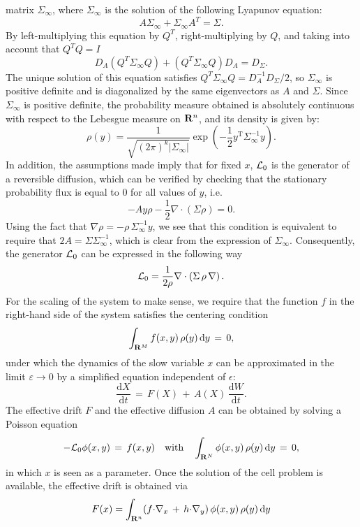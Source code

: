 matrix $\Sigma_\infty$, where $\Sigma_\infty$ is the solution of the
following Lyapunov equation:
$$ A \Sigma_\infty + \Sigma_\infty A^T = \Sigma. $$
By left-multiplying this equation by $Q^T$, right-multiplying by $Q$, and
taking into account that $Q^T Q = I$
$$ D_A (Q^T \Sigma_\infty Q) + (Q^T\Sigma_\infty Q)  D_A= D_\Sigma. $$ 
The unique solution of this equation satisfies $Q^T \Sigma_\infty Q = D_A^{-1}
D_\Sigma/2$, so $\Sigma_\infty$ is positive definite and is diagonalized by the
same eigenvectors as $A$ and $\Sigma$. Since $\Sigma_\infty$ is positive
definite, the probability measure obtained is absolutely continuous with
respect to the Lebesgue measure on $\mathbf R^n$, and its density is given by:
$$\rho(y)= \frac{1}{\sqrt{(2\pi)^k| \Sigma_\infty|}}
\exp\left(-\frac{1}{2}y^\mathrm{T}\Sigma_\infty^{-1}y \right).$$
In addition, the assumptions made imply that for fixed $x$, $\mathcal L_0$ is
the generator of a reversible diffusion, which can be verified by checking that
the stationary probability flux is equal to $0$ for all values of $y$, i.e.
$$ -Ay\rho - \frac{1}{2} \nabla \cdot \left(\Sigma \rho\right) = 0.$$ 
Using the fact that $\nabla \rho =- \rho \, \Sigma_\infty^{-1}y$, we see that
this condition is equivalent to require that $2A = \Sigma \Sigma_\infty^{-1}$,
which is clear from the expression of $\Sigma_\infty$. Consequently, the generator 
$\mathcal L_0$ can be expressed in the following way
$$ \mathcal L_0  = \frac{1}{2\rho}\nabla \cdot \left( \Sigma\,\rho\, \nabla  \right). $$
For the scaling of the system to make sense, we require that the function $f$
in the right-hand side of the system satisfies the centering condition
$$
\int_{\mathbf R^M} f(x,y) \, {\rho}(y)\,\mathrm dy \,=\, 0, 
$$
under which the dynamics of the slow variable $x$ can be approximated in the
limit $\varepsilon \to 0$ by a simplified equation independent of $\epsilon$:
\begin{equation*} 
    \frac{\mathrm d X}{\mathrm d t} \,=\,F(X)\,+\,A(X)\,\frac{\mathrm d W}{\mathrm d t}.
\end{equation*} 
The effective drift $F$ and the effective diffusion $A$ can be obtained by
solving a Poisson equation
$$
-\mathcal L_0 \phi(x,y)\,=\, f(x,y) \quad \text{with} \quad \int_{\mathbf R^N} {\phi}(x,y) \,
{\rho}(y) \, \mathrm dy \,=\,0,
$$
in which $x$ is seen as a parameter.  Once the solution of the cell problem is
available, the effective drift is obtained via 
\begin{equation}
    F (x) =  \int_{\mathbf R^n}  (f {\cdot}{\nabla}_x \,+\, h {\cdot}{\nabla}_y)\,{\phi}(x,y)\, {\rho}(y) \, \mathrm dy 
    \label{eq: chap2 drift}
\end{equation}
